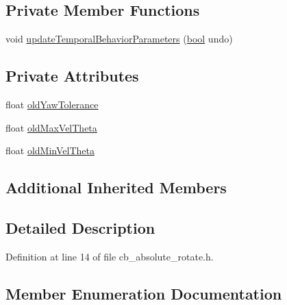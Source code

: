 \subsection*{Private Member Functions}
\begin{DoxyCompactItemize}
\item 
void \hyperlink{classcl__move__base__z_1_1CbAbsoluteRotate_a2d8a4200dcacc00ad60c22ad2af5d4b2}{update\+Temporal\+Behavior\+Parameters} (\hyperlink{classbool}{bool} undo)
\end{DoxyCompactItemize}
\subsection*{Private Attributes}
\begin{DoxyCompactItemize}
\item 
float \hyperlink{classcl__move__base__z_1_1CbAbsoluteRotate_a2cfcd2978e7923494e2e66107e134e27}{old\+Yaw\+Tolerance}
\item 
float \hyperlink{classcl__move__base__z_1_1CbAbsoluteRotate_a131095d57ad3fd423bb9eaebebf61cc9}{old\+Max\+Vel\+Theta}
\item 
float \hyperlink{classcl__move__base__z_1_1CbAbsoluteRotate_a280721d1887e622330ee3ac44b7e84d5}{old\+Min\+Vel\+Theta}
\end{DoxyCompactItemize}
\subsection*{Additional Inherited Members}


\subsection{Detailed Description}


Definition at line 14 of file cb\+\_\+absolute\+\_\+rotate.\+h.



\subsection{Member Enumeration Documentation}
\mbox{\label{classcl__move__base__z_1_1CbAbsoluteRotate_ab8d45e43594a3fc6a71c08f07b5dbef0}} 
